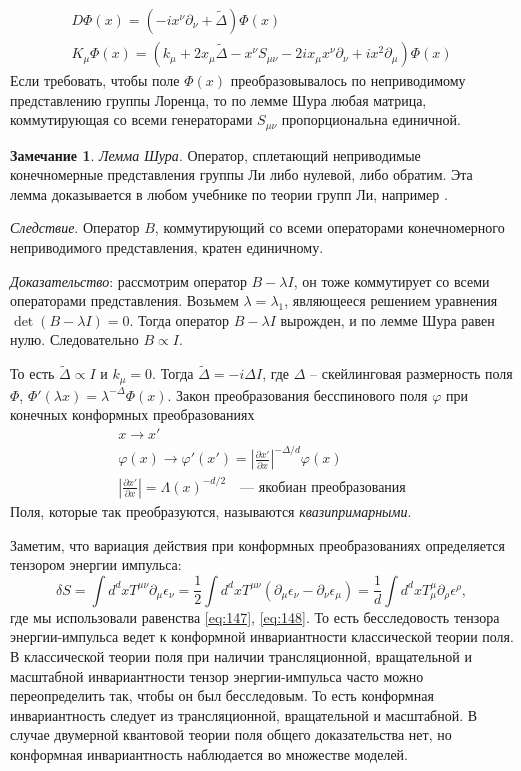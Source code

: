 \documentclass[a4paper,12pt]{article} \usepackage[utf8x]{inputenc} \usepackage[russian]{babel}
\theoremstyle{definition} \newtheorem{corollary}{Corollary}[theorem] \theoremstyle{definition}
\newtheorem{mynote}{Замечание}[section] \theoremstyle{definition}
\begin{document}
\begin{eqnarray}
  \label{eq:181} D\Phi(x)=(-ix^{\nu}\partial_{\nu}+\tilde \Delta)\Phi(x)\\
K_{\mu}\Phi(x)=(k_{\mu}+2x_{\mu}\tilde\Delta
-x^{\nu}S_{\mu\nu}-2ix_{\mu}x^{\nu}\partial_{\nu}+ix^{2} \partial_{\mu})\Phi(x)
\end{eqnarray} Если требовать, чтобы поле $\Phi(x)$ преобразовывалось по неприводимому представлению
группы Лоренца, то по лемме Шура любая матрица, коммутирующая со всеми генераторами $S_{\mu\nu}$
пропорциональна единичной.
\begin{mynote}
  
  {\it Лемма Шура}. Оператор, сплетающий неприводимые конечномерные представления группы Ли либо
нулевой, либо обратим. Эта лемма доказывается в любом учебнике по теории групп Ли, например
\cite{golod2001}.

  {\it Следствие}. Оператор $B$, коммутирующий со всеми операторами конечномерного неприводимого
представления, кратен единичному.

  {\it Доказательство}: рассмотрим оператор $B-\lambda I$, он тоже коммутирует со всеми операторами
представления. Возьмем $\lambda=\lambda_1$, являющееся решением уравнения $\det (B-\lambda I)=0$.
Тогда оператор $B-\lambda I$ вырожден, и по лемме Шура равен нулю. Следовательно $B\propto I$.
\end{mynote}

То есть $\tilde \Delta\propto I$ и $k_{\mu}=0$. Тогда $\tilde \Delta =-i \Delta I$, где $\Delta$ --
скейлинговая размерность поля $\Phi$, $\Phi'(\lambda x)=\lambda^{-\Delta}\Phi(x)$. Закон
преобразования бесспинового поля $\varphi$ при конечных конформных преобразованиях
\begin{eqnarray}
  \label{eq:182} x\to x'\\ \varphi(x)\to \varphi'(x')=\left|\frac{\partial x'}{\partial
x}\right|^{-\Delta/d}\varphi(x)\\ \left|\frac{\partial x'}{\partial x}\right|=\Lambda(x)^{-d/2}
\quad\mbox{--- якобиан преобразования}
\end{eqnarray} Поля, которые так преобразуются, называются {\it квазипримарными}.

Заметим, что вариация действия при конформных преобразованиях определяется тензором энергии
импульса:
\begin{equation}
  \label{eq:183} \delta S=\int d^{d}x T^{\mu\nu}\partial_{\mu}\epsilon_{\nu}=\frac{1}{2} \int d^{d}x
T^{\mu\nu}(\partial_{\mu}\epsilon_{\nu}-\partial_{\nu}\epsilon_{\mu})=\frac{1}{d}\int d^{d}x
T^{\mu}_{\mu}\partial_{\rho}\epsilon^{\rho},
\end{equation} где мы использовали равенства \eqref{eq:147}, \eqref{eq:148}. То есть бесследовость
тензора энергии-импульса ведет к конформной инвариантности классической теории поля. В классической
теории поля при наличии трансляционной, вращательной и масштабной инвариантности тензор
энергии-импульса часто можно переопределить так, чтобы он был бесследовым. То есть конформная
инвариантность следует из трансляционной, вращательной и масштабной. В случае двумерной квантовой
теории поля общего доказательства нет, но конформная инвариантность наблюдается во множестве
моделей.
\end{document}

